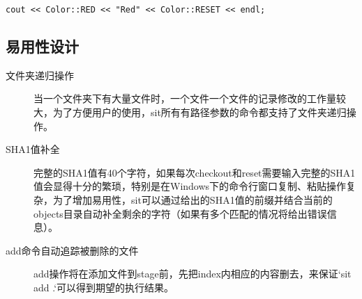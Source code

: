 \begin{lstlisting}
cout << Color::RED << "Red" << Color::RESET << endl;
\end{lstlisting}

\subsection{易用性设计}

\begin{description}
	\item[文件夹递归操作] 当一个文件夹下有大量文件时，一个文件一个文件的记录修改的工作量较大，为了方便用户的使用，sit所有有路径参数的命令都支持了文件夹递归操作。
	\item[SHA1值补全] 完整的SHA1值有40个字符，如果每次checkout和reset需要输入完整的SHA1值会显得十分的繁琐，特别是在Windows下的命令行窗口复制、粘贴操作复杂，为了增加易用性，sit可以通过给出的SHA1值的前缀并结合当前的objects目录自动补全剩余的字符（如果有多个匹配的情况将给出错误信息）。
	\item[add命令自动追踪被删除的文件] add操作将在添加文件到stage前，先把index内相应的内容删去，来保证`sit add .`可以得到期望的执行结果。
\end{description}